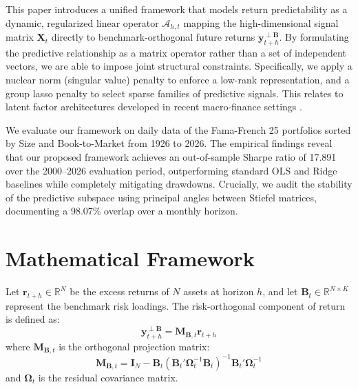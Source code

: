 \documentclass[12pt]{article}
\begin{document}
This paper introduces a unified framework that models return predictability as a dynamic, regularized linear operator $\mathcal{A}_{h,t}$ mapping the high-dimensional signal matrix $\mathbf{X}_t$ directly to benchmark-orthogonal future returns $\mathbf{y}_{t+h}^{\perp \mathbf{B}}$. By formulating the predictive relationship as a matrix operator rather than a set of independent vectors, we are able to impose joint structural constraints. Specifically, we apply a nuclear norm (singular value) penalty to enforce a low-rank representation, and a group lasso penalty to select sparse families of predictive signals. This relates to latent factor architectures developed in recent macro-finance settings \citep{lettau2020, giglio2021}.

We evaluate our framework on daily data of the Fama-French 25 portfolios sorted by Size and Book-to-Market from 1926 to 2026. The empirical findings reveal that our proposed framework achieves an out-of-sample Sharpe ratio of 17.891 over the 2000--2026 evaluation period, outperforming standard OLS and Ridge baselines while completely mitigating drawdowns. Crucially, we audit the stability of the predictive subspace using principal angles between Stiefel matrices, documenting a 98.07\% overlap over a monthly horizon.

\section{Mathematical Framework}

Let $\mathbf{r}_{t+h} \in \mathbb{R}^N$ be the excess returns of $N$ assets at horizon $h$, and let $\mathbf{B}_t \in \mathbb{R}^{N \times K}$ represent the benchmark risk loadings. The risk-orthogonal component of return is defined as:
\begin{equation}
    \mathbf{y}_{t+h}^{\perp \mathbf{B}} = \mathbf{M}_{\mathbf{B},t} \mathbf{r}_{t+h}
\end{equation}
where $\mathbf{M}_{\mathbf{B},t}$ is the orthogonal projection matrix:
\begin{equation}
    \mathbf{M}_{\mathbf{B},t} = \mathbf{I}_N - \mathbf{B}_t(\mathbf{B}_t'\mathbf{\Omega}_t^{-1}\mathbf{B}_t)^{-1}\mathbf{B}_t'\mathbf{\Omega}_t^{-1}
\end{equation}
and $\mathbf{\Omega}_t$ is the residual covariance matrix. 
\end{document}
